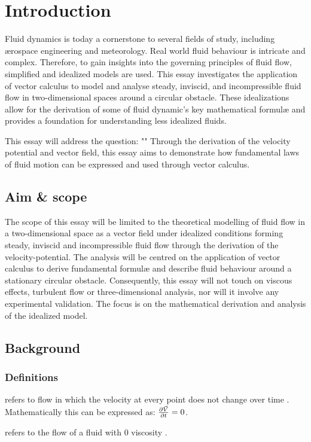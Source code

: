 \section{Introduction}
Fluid dynamics is today a cornerstone to several fields of study, including ærospace engineering and meteorology.
Real world fluid behaviour is intricate and complex. Therefore, to gain insights into the governing principles of
fluid flow, simplified and idealized models are used. This essay investigates the application of vector calculus
to model and analyse steady, inviscid, and incompressible fluid flow in two-dimensional spaces around a circular
obstacle. These idealizations allow for the derivation of some of fluid dynamic's key mathematical formulæ and
provides a foundation for understanding less idealized fluids.

This essay will address the question: "\researchquestion" Through the derivation of the velocity potential and
vector field, this essay aims to demonstrate how fundamental laws of fluid motion can be expressed and used through
vector calculus.

\subsection{Aim \& scope}
The scope of this essay will be limited to the theoretical modelling of fluid flow in a two-dimensional space
as a vector field under idealized conditions forming steady, inviscid and incompressible fluid flow through the 
derivation of the velocity-potential. The analysis will be centred on the application of vector calculus to derive
fundamental formulæ and describe fluid behaviour around a stationary circular obstacle. Consequently, this essay
will not touch on viscous effects, turbulent flow or three-dimensional analysis, nor will it involve any experimental 
validation. The focus is on the mathematical derivation and analysis of the idealized model.

\subsection{Background}
\subsubsection{Definitions}
\begin{defn} %
     refers to flow in which the velocity at every point does not change over time \cite{CRACIUNOIU2001559}. Mathematically this can be expressed as: $\pdv{\vec{V}}{t}=0$.
\end{defn}
\begin{defn} %
     refers to the flow of a fluid with 0 viscosity \cite{ANDERSON20031}.
\end{defn}

